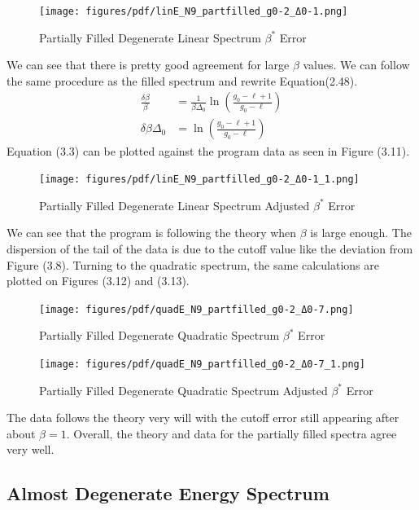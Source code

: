 \begin{figure}[H]
    \centering
    \texttt{[image: figures/pdf/linE\_N9\_partfilled\_g0-2\_Δ0-1.png]}
    \caption{Partially Filled Degenerate Linear Spectrum $\beta^*$ Error}
    \label{fig:PartiallyFilledDegenerateLinearSpectrum}
\end{figure}

We can see that there is pretty good agreement for large $\beta$ values. We can follow the same procedure as the filled spectrum and rewrite Equation(2.48).
\begin{align}
    \frac{\delta\beta}{\beta}&=\frac{1}{\beta\Delta_0}\ln(\frac{g_0-\ell+1}{g_0-\ell})\nonumber\\
    \delta\beta \Delta_0&=\ln(\frac{g_0-\ell+1}{g_0-\ell})
\end{align}
Equation (3.3) can be plotted against the program data as seen in Figure (3.11). 

\begin{figure}[H]
    \centering
    \texttt{[image: figures/pdf/linE\_N9\_partfilled\_g0-2\_Δ0-1\_1.png]}
    \caption{Partially Filled Degenerate Linear Spectrum Adjusted $\beta^*$ Error}
    \label{fig:PartiallyFilledDegenerateLinearSpectrumAdjustedError}
\end{figure}
We can see that the program is following the theory when $\beta$ is large enough. The dispersion of the tail of the data is due to the cutoff value like the deviation from Figure (3.8). Turning to the quadratic spectrum, the same calculations are plotted on Figures (3.12) and (3.13). 

\begin{figure}[H]
    \centering
    \texttt{[image: figures/pdf/quadE\_N9\_partfilled\_g0-2\_Δ0-7.png]}
    \caption{Partially Filled Degenerate Quadratic Spectrum $\beta^*$ Error}
    \label{fig:PartiallyFilledDegenerateQuadraticSpectrumError}
\end{figure}

\begin{figure}[H]
    \centering
    \texttt{[image: figures/pdf/quadE\_N9\_partfilled\_g0-2\_Δ0-7\_1.png]}
    \caption{Partially Filled Degenerate Quadratic Spectrum Adjusted $\beta^*$ Error}
    \label{fig:PartiallyFilledDegenerateQuadraticSpectrumAdjustedError}
\end{figure}

The data follows the theory very will with the cutoff error still appearing after about $\beta=1$. Overall, the theory and data for the partially filled spectra agree very well. 
\subsection{Almost Degenerate Energy Spectrum}

